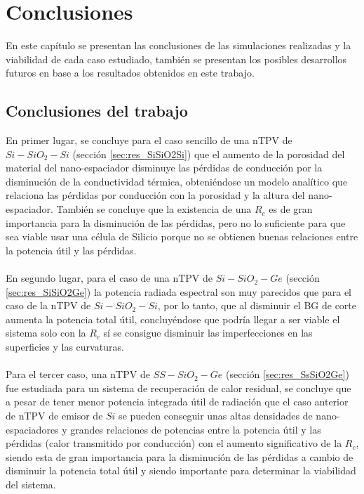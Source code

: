 \chapter{Conclusiones}
En este capítulo se presentan las conclusiones de las simulaciones realizadas y la viabilidad de cada caso estudiado, también se presentan los posibles desarrollos futuros en base a los resultados obtenidos en este trabajo.

\section{Conclusiones del trabajo}
En primer lugar, se concluye para el caso sencillo de una nTPV de $Si-SiO_2-Si$ (sección \ref{sec:res_SiSiO2Si}) que el aumento de la porosidad del material del nano-espaciador disminuye las pérdidas de conducción por la disminución de la conductividad térmica, obteniéndose un modelo analítico que relaciona las pérdidas por conducción con la porosidad y la altura del nano-espaciador. También se concluye que la existencia de una $R_c$ es de gran importancia para la disminución de las pérdidas, pero no lo suficiente para que sea viable usar una célula de Silicio porque no se obtienen buenas relaciones entre la potencia útil y las pérdidas.\\\\
En segundo lugar, para el caso de una nTPV de $Si-SiO_2-Ge$ (sección \ref{sec:res_SiSiO2Ge}) la potencia radiada espectral son muy parecidos que para el caso de la nTPV de $Si-SiO_2-Si$, por lo tanto, que al disminuir el BG de corte aumenta la potencia total útil, concluyéndose que podría llegar a ser viable el sistema solo con la $R_c$ sí se consigue disminuir las imperfecciones en las superficies y las curvaturas.\\\\
Para el tercer caso, una nTPV de $SS-SiO_2-Ge$ (sección \ref{sec:res_SsSiO2Ge}) fue estudiada para un sistema de recuperación de calor residual, se concluye que a pesar de tener menor potencia integrada útil de radiación que el caso anterior de nTPV de emisor de $Si$ se pueden conseguir unas altas densidades de nano-espaciadores y grandes relaciones de potencias entre la potencia útil y las pérdidas (calor transmitido por conducción) con el aumento significativo de la $R_c$, siendo esta de gran importancia para la disminución de las pérdidas a cambio de disminuir la potencia total útil y siendo importante para determinar la viabilidad del sistema.\\\\
